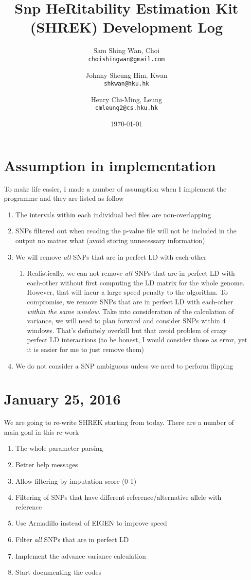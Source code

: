 \documentclass[12pt]{article}
\title{Snp HeRitability Estimation Kit (SHREK) Development Log}
\date{\today}
\author{Sam Shing Wan, Choi\\ 
	\texttt{choishingwan@gmail.com}
	\and
	Johnny Sheung Him, Kwan\\
	\texttt{shkwan@hku.hk}
	\and
	Henry Chi-Ming, Leung\\
	\texttt{cmleung2@cs.hku.hk}
}
\begin{document}
	
	\maketitle
	\tableofcontents
	
	\section{Assumption in implementation}
	To make life easier, I made a number of assumption when I implement the programme and they are listed as follow
	\begin{enumerate}
		\item The intervals within each individual bed files are non-overlapping
		\item SNPs filtered out when reading the p-value file will not be included in the output no matter what (avoid storing unnecessary information)
		\item We will remove \emph{all} SNPs that are in perfect LD with each-other
		\begin{enumerate}
			\item Realistically, we can not remove \emph{all} SNPs that are in perfect LD with each-other without first computing the LD matrix for the whole genome. 
			However, that will incur a large speed penalty to the algorithm.
			To compromise, we remove SNPs that are in perfect LD with each-other \emph{within the same window}.
			Take into consideration of the calculation of variance, we will need to plan forward and consider SNPs within 4 windows. 
			That's definitely overkill but that avoid problem of crazy perfect LD interactions (to be honest, I would consider those as error, yet it is easier for me to just remove them)
		\end{enumerate}
		\item We do not consider a SNP ambiguous unless we need to perform flipping
	\end{enumerate}
	
	\section{January 25, 2016}
	We are going to re-write SHREK starting from today. 
	There are a number of main goal in this re-work
	\begin{enumerate}
		\item The whole parameter parsing 
		\item Better help messages
		\item Allow filtering by imputation score (0-1)
		\item Filtering of SNPs that have different reference/alternative allele with reference
		\item Use Armadillo instead of EIGEN to improve speed
		\item Filter \emph{all} SNPs that are in perfect LD
		\item Implement the advance variance calculation 
		\item Start documenting the codes
	\end{enumerate}
\end{document}
